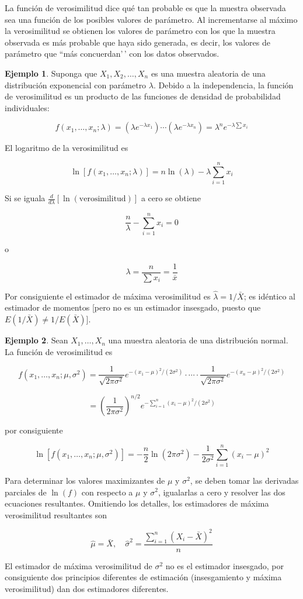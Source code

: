 \documentclass[
  11pt,
]{book}
\theoremstyle{definition}
\theoremstyle{definition}
\newtheorem{example}{Ejemplo}[chapter]
\theoremstyle{definition}
\theoremstyle{definition}
\theoremstyle{remark}
\begin{document}
La función de verosimilitud dice qué tan probable es que la muestra observada sea una función de los posibles valores de parámetro. Al incrementarse al máximo la verosimilitud se obtienen los valores de parámetro con los que la muestra observada es más probable que haya sido generada, es decir, los valores de parámetro que ``más concuerdan'\,' con los datos observados.

\begin{example}
Suponga que \(X_1, X_2, \ldots, X_n\) es una muestra aleatoria de una distribución exponencial con parámetro \(\lambda\). Debido a la independencia, la función de verosimilitud es un producto de las funciones de densidad de probabilidad individuales:

\[
f(x_1, \ldots, x_n; \lambda) = (\lambda e^{-\lambda x_1}) \cdots (\lambda e^{-\lambda x_n}) = \lambda^n e^{-\lambda \sum x_i}
\]

El logaritmo de la verosimilitud es

\[
\ln[f(x_1, \ldots, x_n; \lambda)] = n \ln(\lambda) - \lambda \sum_{i=1}^{n} x_i
\]

Si se iguala \(\frac{d}{d\lambda}[\ln(\text{verosimilitud})]\) a cero se obtiene

\[
\frac{n}{\lambda} - \sum_{i=1}^{n} x_i = 0
\]

o

\[
\lambda = \frac{n}{\sum x_i} = \frac{1}{\bar{x}}
\]

Por consiguiente el estimador de máxima verosimilitud es \(\hat{\lambda} = 1/\bar{X}\); es idéntico al estimador de momentos {[}pero no es un estimador insesgado, puesto que \(E(1/\bar{X}) \neq 1/E(\bar{X})\){]}.
\end{example}

\begin{example}
Sean \(X_1, \ldots, X_n\) una muestra aleatoria de una distribución normal. La función de verosimilitud es

\[
f(x_1, \ldots, x_n; \mu, \sigma^2) = \frac{1}{\sqrt{2\pi\sigma^2}} e^{-(x_1 - \mu)^2 / (2\sigma^2)} \cdot \cdots \cdot \frac{1}{\sqrt{2\pi\sigma^2}} e^{-(x_n - \mu)^2 / (2\sigma^2)}
\]

\[
= \left(\frac{1}{2\pi\sigma^2}\right)^{n/2} e^{-\sum_{i=1}^n (x_i - \mu)^2 / (2\sigma^2)}
\]

por consiguiente

\[
\ln[f(x_1, \ldots, x_n; \mu, \sigma^2)] = -\frac{n}{2} \ln(2\pi\sigma^2) - \frac{1}{2\sigma^2} \sum_{i=1}^n (x_i - \mu)^2
\]

Para determinar los valores maximizantes de \(\mu\) y \(\sigma^2\), se deben tomar las derivadas parciales de \(\ln(f)\) con respecto a \(\mu\) y \(\sigma^2\), igualarlas a cero y resolver las dos ecuaciones resultantes. Omitiendo los detalles, los estimadores de máxima verosimilitud resultantes son

\[
\hat{\mu} = \bar{X}, \quad \hat{\sigma}^2 = \frac{\sum_{i=1}^n (X_i - \bar{X})^2}{n}
\]

El estimador de máxima verosimilitud de \(\sigma^2\) no es el estimador insesgado, por consiguiente dos principios diferentes de estimación (insesgamiento y máxima verosimilitud) dan dos estimadores diferentes.
\end{example}
\end{document}
